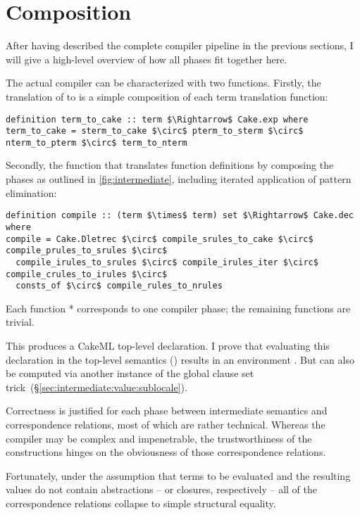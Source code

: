 
\section{Composition}

After having described the complete compiler pipeline in the previous sections, I will give a high-level overview of how all phases fit together here.

The actual compiler can be characterized with two functions.
Firstly, the translation of  to  is a simple composition of each term translation function:
%
\begin{lstlisting}[language=Isabelle]
definition term_to_cake :: term $\Rightarrow$ Cake.exp where
term_to_cake = sterm_to_cake $\circ$ pterm_to_sterm $\circ$ nterm_to_pterm $\circ$ term_to_nterm
\end{lstlisting}
%
Secondly, the function that translates function definitions by composing the phases as outlined in \cref{fig:intermediate}, including iterated application of pattern elimination:
\begin{lstlisting}[language=Isabelle]
definition compile :: (term $\times$ term) set $\Rightarrow$ Cake.dec where
compile = Cake.Dletrec $\circ$ compile_srules_to_cake $\circ$ compile_prules_to_srules $\circ$
  compile_irules_to_srules $\circ$ compile_irules_iter $\circ$ compile_crules_to_irules $\circ$
  consts_of $\circ$ compile_rules_to_nrules
\end{lstlisting}
Each function * corresponds to one compiler phase;
the remaining functions are trivial.

This produces a CakeML top-level declaration.
I prove that evaluating this declaration in the top-level semantics () results in an environment .
But  can also be computed via another instance of the global clause set trick~(§\ref{sec:intermediate:value:sublocale}).

Correctness is justified for each phase between intermediate semantics and correspondence relations, most of which are rather technical.
Whereas the compiler may be complex and impenetrable, the trustworthiness of the constructions hinges on the obviousness of those correspondence relations.

Fortunately, under the assumption that terms to be evaluated and the resulting values do not contain abstractions -- or closures, respectively -- all of the correspondence relations collapse to simple structural equality.

